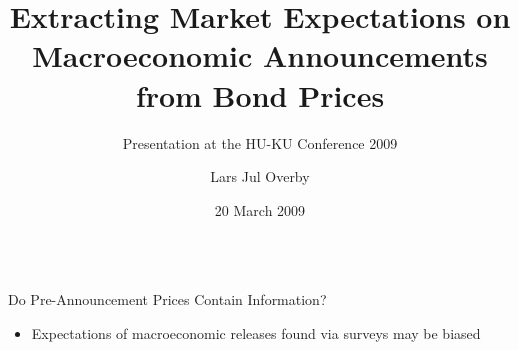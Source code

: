 \documentclass[final]{beamer}
\institute[University of Copenhagen / Danmarks Nationalbank]{University of Copenhagen / Danmarks Nationalbank}
\subtitle{Presentation at the HU-KU Conference 2009}
\begin{document}
\title[Extracting Market Expectations on Macroeconomic Announcements from
Bond Prices]{Extracting Market Expectations on Macroeconomic Announcements
from Bond Prices}
\author[Lars Jul Overby]{Lars Jul Overby}
\date[20 March 2009]{20 March 2009}

\begin{frame}
\begin{columns}[t]%

\begin{column}{.43 \linewidth}%

\vspace{2cm}%

%
%
%
%
%
%
%
\begin{block}{Do Pre-Announcement Prices Contain Information?}

\begin{itemize}

\item Expectations of macroeconomic releases found via surveys may be biased


\end{itemize}
\end{block}
\end{column}
\end{columns}
\end{frame}
\end{document}

